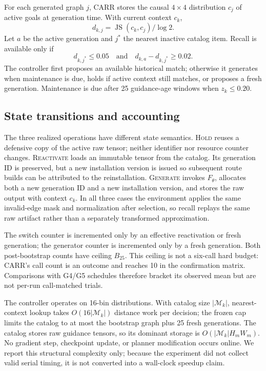 \documentclass[sigconf,review,anonymous]{acmart}
\newcommand{\carr}{\textsc{CARR}\xspace}
\begin{document}
For each generated graph $j$, \carr stores the causal $4\times4$ distribution
$c_j$ of active goals at generation time. With current context $c_k$,
\begin{equation}
 d_{k,j}=\operatorname{JS}(c_k,c_j)/\log 2.
\end{equation}
Let $a$ be the active generation and $j^*$ the nearest inactive catalog item.
Recall is available only if
\begin{equation}
 d_{k,j^*}\leq0.05
 \quad\text{and}\quad
 d_{k,a}-d_{k,j^*}\geq0.02.
\end{equation}
The controller first proposes an available historical match; otherwise it
generates when maintenance is due, holds if active context still matches, or
proposes a fresh generation. Maintenance is due after 25 guidance-age windows
when $z_k\leq0.20$.

\subsection{State transitions and accounting}

The three realized operations have different state semantics. \textsc{Hold}
reuses a defensive copy of the active raw tensor; neither identifier nor
resource counter changes. \textsc{Reactivate} loads an immutable tensor from
the catalog. Its generation ID is preserved, but a new installation version is
issued so subsequent route builds can be attributed to the reinstallation.
\textsc{Generate} invokes $F_\theta$, allocates both a new generation ID and a
new installation version, and stores the raw output with context $c_k$. In all
three cases the environment applies the same invalid-edge mask and
normalization after selection, so recall replays the same raw artifact rather
than a separately transformed approximation.

The switch counter is incremented only by an effective reactivation or fresh
generation; the generator counter is incremented only by a fresh generation.
Both post-bootstrap counts have ceiling $B_{25}$. This ceiling is not a
six-call hard budget: \carr's call count is an outcome and reaches 10 in the
confirmation matrix. Comparisons with G4/G5 schedules therefore bracket its
observed mean but are not per-run call-matched trials.

The controller operates on 16-bin distributions. With catalog size
$|\mathcal{M}_k|$, nearest-context lookup takes
$O(16|\mathcal{M}_k|)$ distance work per decision; the frozen cap limits the
catalog to at most the bootstrap graph plus 25 fresh generations. The catalog
stores raw guidance tensors, so its dominant storage is
$O(|\mathcal{M}_k|H_mW_m)$. No gradient step, checkpoint update, or planner
modification occurs online. We report this structural complexity only; because
the experiment did not collect valid serial timing, it is not converted into a
wall-clock speedup claim.
\end{document}
